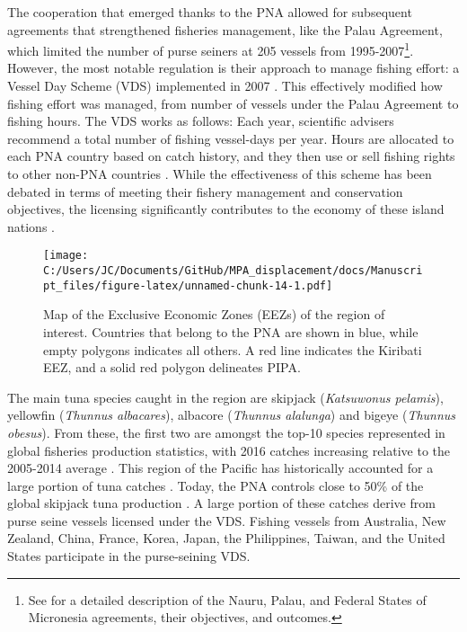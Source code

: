 \documentclass[11pt,]{article}
\let\rmarkdownfootnote\footnote%
\def\footnote{\protect\rmarkdownfootnote}
\begin{document}
The cooperation that emerged thanks to the PNA allowed for subsequent
agreements that strengthened fisheries management, like the Palau
Agreement, which limited the number of purse seiners at 205 vessels from
1995-2007\footnote{See \citet{havice_2010} for a detailed description of
  the Nauru, Palau, and Federal States of Micronesia agreements, their
  objectives, and outcomes.}. However, the most notable regulation is
their approach to manage fishing effort: a Vessel Day Scheme (VDS)
implemented in 2007 \citep{havice_2013}. This effectively modified how
fishing effort was managed, from number of vessels under the Palau
Agreement to fishing hours. The VDS works as follows: Each year,
scientific advisers recommend a total number of fishing vessel-days per
year. Hours are allocated to each PNA country based on catch history,
and they then use or sell fishing rights to other non-PNA countries
\citep{aqorau_2018}. While the effectiveness of this scheme has been
debated in terms of meeting their fishery management and conservation
objectives, the licensing significantly contributes to the economy of
these island nations \citep{havice_2010}.

\begin{figure}
\centering
\texttt{[image: C:/Users/JC/Documents/GitHub/MPA\_displacement/docs/Manuscript\_files/figure-latex/unnamed-chunk-14-1.pdf]}
\caption{\label{fig:unnamed-chunk-14}\label{fig:PNA_map}Map of the Exclusive
Economic Zones (EEZs) of the region of interest. Countries that belong
to the PNA are shown in blue, while empty polygons indicates all others.
A red line indicates the Kiribati EEZ, and a solid red polygon
delineates PIPA.}
\end{figure}

The main tuna species caught in the region are skipjack
(\emph{Katsuwonus pelamis}), yellowfin (\emph{Thunnus albacares}),
albacore (\emph{Thunnus alalunga}) and bigeye (\emph{Thunnus obesus}).
From these, the first two are amongst the top-10 species represented in
global fisheries production statistics, with 2016 catches increasing
relative to the 2005-2014 average \citep{fao_2018}. This region of the
Pacific has historically accounted for a large portion of tuna catches
\citep{aqorau_1997}. Today, the PNA controls close to 50\% of the global
skipjack tuna production \citep{pna_website_2018}. A large portion of
these catches derive from purse seine vessels licensed under the VDS.
Fishing vessels from Australia, New Zealand, China, France, Korea,
Japan, the Philippines, Taiwan, and the United States participate in the
purse-seining VDS.
\end{document}
